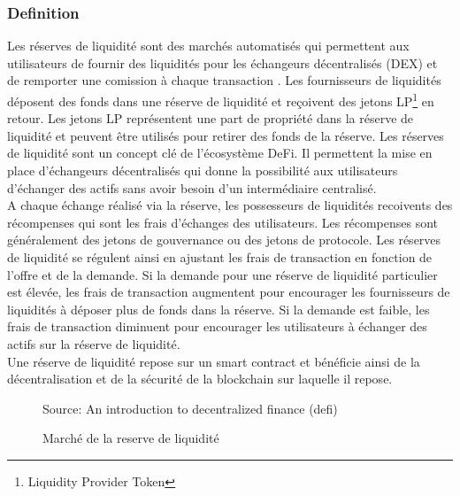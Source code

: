 
\subsubsection{Definition}
Les réserves de liquidité sont des marchés automatisés qui permettent aux utilisateurs de fournir des liquidités pour les échangeurs décentralisés (DEX) et de 
remporter une comission à chaque transaction \cite{jensen2021introduction, belchior2022survey, augustin2022yield}. 
Les fournisseurs de liquidités déposent des fonds dans une réserve de liquidité et reçoivent des jetons 
LP\footnote{Liquidity Provider Token} en retour. Les jetons LP représentent une part de propriété dans la réserve de liquidité et peuvent être utilisés pour 
retirer des fonds de la réserve. Les réserves de liquidité sont un concept clé de l’écosystème DeFi. Il permettent la mise en place d'échangeurs décentralisés 
qui donne la possibilité aux utilisateurs d’échanger des actifs sans avoir besoin d’un intermédiaire centralisé. \\
A chaque échange réalisé via la réserve, les possesseurs de liquidités recoivents des récompenses qui sont les frais d'échanges des utilisateurs. Les récompenses 
sont généralement des jetons de gouvernance ou des jetons de protocole. Les réserves de liquidité se régulent ainsi en ajustant les frais de transaction 
en fonction de l’offre et de la demande. Si la demande pour une réserve de liquidité particulier est élevée, les frais de transaction augmentent pour encourager 
les fournisseurs de liquidités à déposer plus de fonds dans la réserve. Si la demande est faible, les frais de transaction diminuent pour encourager les 
utilisateurs à échanger des actifs sur la réserve de liquidité. \\
Une réserve de liquidité repose sur un smart contract et bénéficie ainsi de la décentralisation et de la sécurité de la \gls{blockchain} sur laquelle il repose.
\begin{figure}[h!]
    \centering
    {\scriptsize Source: An introduction to decentralized finance (defi) \cite{jensen2021introduction} }
    \caption{Marché de la reserve de liquidité}
    \label{fig:liquidite}
\end{figure}


